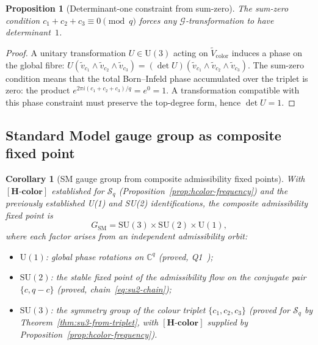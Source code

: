 \documentclass[11pt,a4paper]{article}
\newtheorem{proposition}[theorem]{Proposition}
\newtheorem{corollary}[theorem]{Corollary}
\theoremstyle{definition}
\theoremstyle{remark}
\newcommand{\SU}{\mathrm{SU}}
\newcommand{\Hcolor}{\mathbf{[H\text{-}color]}}
\newcommand{\C}{\mathbb{C}}
\newcommand{\Sq}{\mathcal{S}_q}
\begin{document}
      \begin{proposition}[Determinant-one constraint from sum-zero]
        \label{prop:det1}
        The sum-zero condition $c_1 + c_2 + c_3 \equiv 0 \pmod{q}$ forces any $\mathcal{G}$-transformation
        to have determinant~$1$.
      \end{proposition}

      \begin{proof}
        A unitary transformation $U \in \mathrm{U}(3)$ acting on $\tilde{V}_{\mathrm{color}}$ induces a
        phase on the global fibre:
        $U(\tilde{v}_{c_1} \wedge \tilde{v}_{c_2} \wedge \tilde{v}_{c_3}) = (\det U)
        (\tilde{v}_{c_1} \wedge \tilde{v}_{c_2} \wedge \tilde{v}_{c_3})$.
        The sum-zero condition means that the total Born--Infeld phase accumulated over the triplet is
        zero: the product $e^{2\pi i(c_1+c_2+c_3)/q} = e^{0} = 1$.
        A transformation compatible with this phase constraint must preserve the
        top-degree form, hence $\det U = 1$.
      \end{proof}

    \subsection{Standard Model gauge group as composite fixed point}
      \label{ssec:sm-gauge-group}

      \begin{corollary}[SM gauge group from composite admissibility fixed points]
        \label{cor:sm-gauge}
        With $\Hcolor$ established for $\Sq$ (Proposition~\ref{prop:hcolor-frequency}) and the
        previously established U(1) and SU(2) identifications, the
        composite admissibility fixed point is
        \begin{equation}
          G_{\mathrm{SM}} = \SU(3) \times \SU(2) \times \mathrm{U}(1),
        \end{equation}
        where each factor arises from an independent admissibility orbit:
        \begin{itemize}
          \item $\mathrm{U}(1)$: global phase rotations on $\C^q$ (proved, Q1~\cite{Beau2026q1});
          \item $\SU(2)$: the stable fixed point of the admissibility flow on the conjugate pair
          $\{c, q-c\}$ (proved, chain~\eqref{eq:su2-chain});
          \item $\SU(3)$: the symmetry group of the colour triplet $\{c_1, c_2, c_3\}$
          (proved for $\Sq$ by Theorem~\ref{thm:su3-from-triplet}, with $\Hcolor$ supplied by
          Proposition~\ref{prop:hcolor-frequency}).
        \end{itemize}
      \end{corollary}
\end{document}
